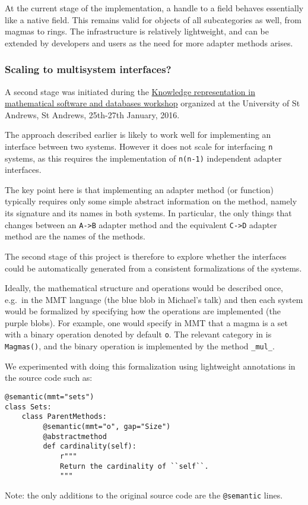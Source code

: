 At the current stage of the implementation, a handle to a \GAP field
behaves essentially like a native \Sage field. This remains valid for
objects of all subcategories as well, from magmas to rings. The
infrastructure is relatively lightweight, and can be extended by
developers and users as the need for more adapter methods arises.

\subsubsection{Scaling to multisystem interfaces?}\label{scaling-to-multisystem-interfaces}

A second stage was initiated during the
\href{http://opendreamkit.org/2015/12/08/WP6StAndrewsMeeting/}{Knowledge
representation in mathematical software and databases workshop}
organized at the University of St Andrews, St Andrews, 25th-27th
January, 2016.

The approach described earlier is likely to work well for implementing
an interface between two systems. However it does not scale for
interfacing \texttt{n} systems, as this requires the implementation of
\texttt{n(n-1)} independent adapter interfaces.

The key point here is that implementing an adapter method (or
function) typically requires only some simple abstract information on
the method, namely its signature and its names in both systems.  In
particular, the only things that changes between an \texttt{A->B}
adapter method and the equivalent \texttt{C->D} adapter method are the
names of the methods.

The second stage of this project is therefore to explore whether the
interfaces could be automatically generated from a consistent
formalizations of the systems.


Ideally, the mathematical structure and operations would be described
once, e.g.~in the MMT language (the blue blob in Michael's talk) and
then each system would be formalized by specifying how the operations
are implemented (the purple blobs). For example, one would specify in
MMT that a magma is a set with a binary operation denoted by default
\texttt{o}. The relevant category in \Sage is \texttt{Magmas()}, and
the binary operation is implemented by the method \texttt{\_mul\_}.

We experimented with doing this formalization using lightweight
annotations in the \Sage source code such as:
\begin{verbatim}
@semantic(mmt="sets")
class Sets:
    class ParentMethods:
         @semantic(mmt="o", gap="Size")
         @abstractmethod
         def cardinality(self):
             r"""
             Return the cardinality of ``self``.
             """
\end{verbatim}
Note: the only additions to the original source code are the
\texttt{@semantic} lines.


